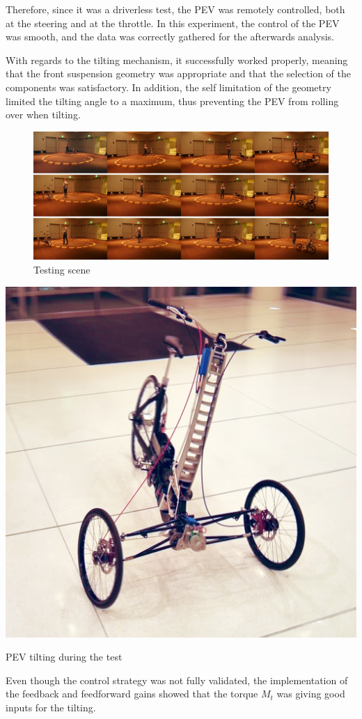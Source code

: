 Therefore, since it was a driverless test, the PEV was remotely controlled, both at the steering and at the throttle. In this experiment, the control of the PEV was smooth, and the data was correctly gathered for the afterwards analysis.

With regards to the tilting mechanism, it successfully worked properly, meaning that the front suspension geometry was appropriate and that the selection of the components was satisfactory. In addition, the self limitation of the geometry limited the tilting angle to a maximum, thus preventing the PEV from rolling over when tilting.

\begin{figure}[!h]
	\includegraphics[width=1\linewidth]{figs/06/scene_2}
	\caption{Testing scene}
	\label{scene_2}
\end{figure}

\newpage

\begin{marginfigure}
	\includegraphics[width=1.15\linewidth]{figs/06/scene00151}
	\caption{PEV tilting during the test}
\end{marginfigure}
Even though the control strategy was not fully validated, the implementation of the feedback and feedforward gains showed that the torque $M_{t}$ was giving good inputs for the tilting.

